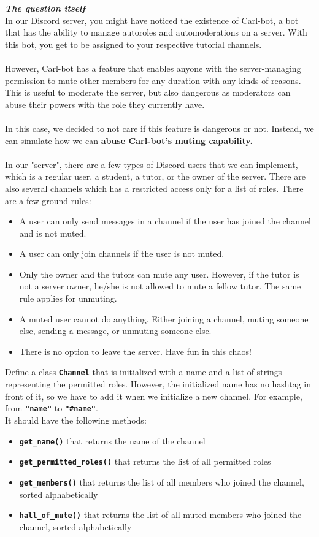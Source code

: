 \textbf{\textit{The question itself}} \\
In our Discord server, you might have noticed the existence of Carl-bot, a bot that has the ability to manage autoroles 
and automoderations on a server. With this bot, you get to be assigned to your respective tutorial channels. \\ \\
However, Carl-bot has a feature that enables anyone with the server-managing permission to mute other members for any duration with any kinds of reasons. This is useful to moderate the server, but also dangerous as moderators can abuse their powers with the role they currently have. \\ \\
In this case, we decided to not care if this feature is dangerous or not. Instead, we can simulate how we can \textbf{abuse Carl-bot's muting capability.} \\ \\
In our "server", there are a few types of Discord users that we can implement, which is a regular user, a student, a tutor, or the owner of the server. There are also several channels which has a restricted access only for a list of roles. There are a few ground rules:
\begin{itemize}
    \item A user can only send messages in a channel if the user has joined the channel and is not muted.
    \item A user can only join channels if the user is not muted.
    \item Only the owner and the tutors can mute any user. However, if the tutor is not a server owner, he/she is not 
    allowed to mute a fellow tutor. The same rule applies for unmuting.
    \item A muted user cannot do anything. Either joining a channel, muting someone else, sending a message, or 
    unmuting someone else.
    \item There is no option to leave the server. Have fun in this chaos!
\end{itemize}

Define a class \texttt{\bfseries Channel} that is initialized with a name and a list of strings representing the 
permitted roles. However, the initialized name has no hashtag in front of it, so we have to add it when we initialize a new channel.
For example, from \texttt{\bfseries "name"} to \texttt{\bfseries "\#name"}. \\
It should have the following methods:
\begin{itemize}
    \item \texttt{\bfseries get\_name()} that returns the name of the channel
    \item \texttt{\bfseries get\_permitted\_roles()} that returns the list of all permitted roles
    \item \texttt{\bfseries get\_members()} that returns the list of all members who joined the channel, sorted alphabetically
    \item \texttt{\bfseries hall\_of\_mute()} that returns the list of all muted members who joined the channel, sorted alphabetically
\end{itemize}

